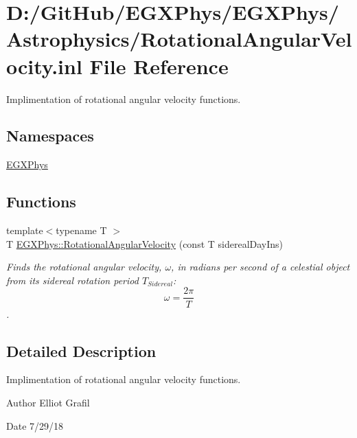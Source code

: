 \hypertarget{_rotational_angular_velocity_8inl}{}\section{D\+:/\+Git\+Hub/\+E\+G\+X\+Phys/\+E\+G\+X\+Phys/\+Astrophysics/\+Rotational\+Angular\+Velocity.inl File Reference}
\label{_rotational_angular_velocity_8inl}


Implimentation of rotational angular velocity functions.  


\subsection*{Namespaces}
\begin{DoxyCompactItemize}
\item 
 \mbox{\hyperlink{namespace_e_g_x_phys}{E\+G\+X\+Phys}}
\end{DoxyCompactItemize}
\subsection*{Functions}
\begin{DoxyCompactItemize}
\item 
{\footnotesize template$<$typename T $>$ }\\T \mbox{\hyperlink{group___e_g_x_phys-_astrophysics-_rotational_angular_velocity_gad8966c9d42ff617677152fa014f7d1db}{E\+G\+X\+Phys\+::\+Rotational\+Angular\+Velocity}} (const T sidereal\+Day\+Ins)
\begin{DoxyCompactList}\small\item\em Finds the rotational angular velocity, $\omega$, in radians per second of a celestial object from its sidereal rotation period $T_{Sidereal}$\+: \[ \omega = \dfrac{2\pi}{T} \]. \end{DoxyCompactList}\end{DoxyCompactItemize}


\subsection{Detailed Description}
Implimentation of rotational angular velocity functions. 

\begin{DoxyAuthor}{Author}
Elliot Grafil 
\end{DoxyAuthor}
\begin{DoxyDate}{Date}
7/29/18 
\end{DoxyDate}
